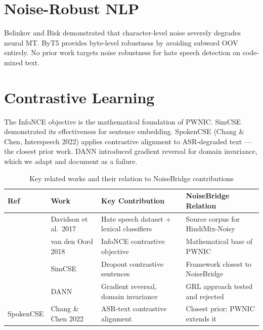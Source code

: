 \documentclass[12pt,a4paper]{report}
\begin{document}
\section{Noise-Robust NLP}
Belinkov and Bisk \cite{belinkov2018synthetic} demonstrated that character-level noise severely degrades neural MT. ByT5 \cite{xue2022byt5} provides byte-level robustness by avoiding subword OOV entirely. No prior work targets noise robustness for hate speech detection on code-mixed text.

\section{Contrastive Learning}
The InfoNCE objective \cite{oord2018representation} is the mathematical foundation of PWNIC. SimCSE \cite{gao2021simcse} demonstrated its effectiveness for sentence embedding. SpokenCSE (Chang \& Chen, Interspeech 2022) applies contrastive alignment to ASR-degraded text --- the closest prior work. DANN \cite{ganin2016domain} introduced gradient reversal for domain invariance, which we adapt and document as a failure.

\begin{table}[H]
\centering
\caption{Key related works and their relation to NoiseBridge contributions}
\label{tab:related}
\small
\begin{tabular}{llp{4.5cm}p{4cm}}
\toprule
\textbf{Ref} & \textbf{Work} & \textbf{Key Contribution} & \textbf{NoiseBridge Relation}\\
\midrule
\cite{davidson2017automated} & Davidson et al.\ 2017 & Hate speech dataset + lexical classifiers & Source corpus for HindiMix-Noisy \\
\cite{oord2018representation} & van den Oord 2018 & InfoNCE contrastive objective & Mathematical base of PWNIC \\
\cite{gao2021simcse} & SimCSE & Dropout contrastive sentences & Framework closest to NoiseBridge \\
\cite{ganin2016domain} & DANN & Gradient reversal, domain invariance & GRL approach tested and rejected \\
SpokenCSE & Chang \& Chen 2022 & ASR-text contrastive alignment & Closest prior; PWNIC extends it \\
\bottomrule
\end{tabular}
\end{table}

\end{document}
